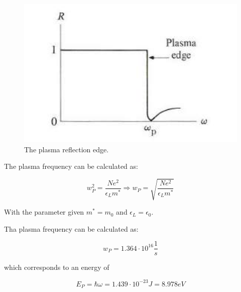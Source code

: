 \begin{figure}[H]
    \centering
    \includegraphics[width=0.6\linewidth]{Graphics/Chapter1/PlasmaFrequency.png}
    \caption{The plasma reflection edge.
    \cite[Elementary Solid State Physics p. 166]{elementary_SSP} }
    \label{fig:PlasmaFrequency}
\end{figure}

The plasma frequency can be calculated as:

\begin{equation}
    w_P^2 = \frac{Ne^2}{\epsilon_L m^*} \Rightarrow w_P = \sqrt{\frac{Ne^2}{\epsilon_L m^*}}
\end{equation}

With the parameter given $m^*=m_0$ and $\epsilon_L = \epsilon_0$.

Tha plasma frequency can be calculated as:

$$w_P = 1.364 \cdot 10^{16} \frac{1}{s}$$

which corresponds to an energy of 

$$E_P = \hbar \omega = 1.439\cdot 10^{-23}J = 8.978eV$$